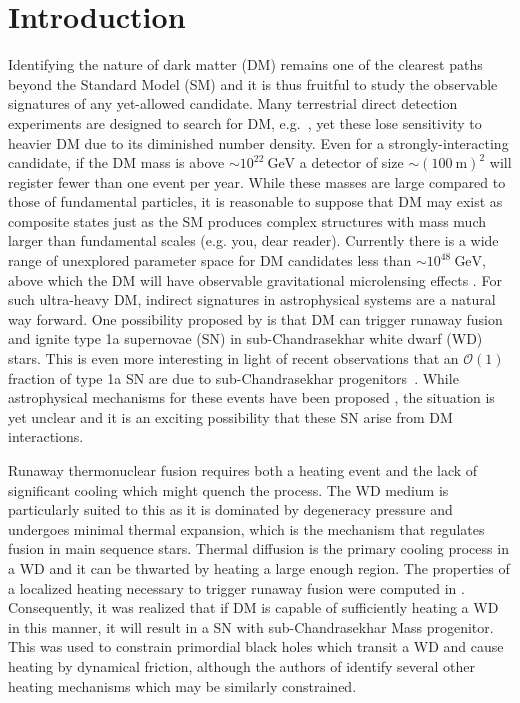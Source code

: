 \documentclass[twocolumn, preprintnumbers,amsmath,amssymb,prd, superscriptaddress]{revtex4}
\newcommand{\OO}{\mathcal{O}}
\newcommand{\GeV}{\text{GeV}}
\begin{document}
\section{Introduction}
\label{sec:Introduction}

Identifying the nature of dark matter (DM) remains one of the clearest paths beyond the Standard Model (SM) and it is thus fruitful to study the observable signatures of any yet-allowed candidate.
Many terrestrial direct detection experiments are designed to search for DM, e.g.~\cite{Akerib:2016vxi, Agnese:2017njq}, yet these lose sensitivity to heavier DM due to its diminished number density.
Even for a strongly-interacting candidate, if the DM mass is above $\sim 10^{22} ~\GeV$ a detector of size $\sim (100 ~\text{m})^2$ will register fewer than one event per year.
While these masses are large compared to those of fundamental particles, it is reasonable to suppose that DM may exist as composite states just as the SM produces complex structures with mass much larger than fundamental scales (e.g. you, dear reader).
Currently there is a wide range of unexplored parameter space for DM candidates less than $\sim 10^{48} ~\GeV$, above which the DM will have observable gravitational microlensing effects \cite{Griest:2013aaa}.
For such ultra-heavy DM, indirect signatures in astrophysical systems are a natural way forward.
One possibility proposed by \cite{Graham:2015apa} is that DM can trigger runaway fusion and ignite type 1a supernovae (SN) in sub-Chandrasekhar white dwarf (WD) stars.
This is even more interesting in light of recent observations that an $\OO(1)$ fraction of type 1a SN are due to sub-Chandrasekhar progenitors~\cite{Scalzo:2014sap, Scalzo:2014wxa}.
While astrophysical mechanisms for these events have been proposed \cite{Woosley1994,Fink:2007fv}, the situation is yet unclear and it is an exciting possibility that these SN arise from DM interactions.

Runaway thermonuclear fusion requires both a heating event and the lack of significant cooling which might quench the process.
The WD medium is particularly suited to this as it is dominated by degeneracy pressure and undergoes minimal thermal expansion, which is the mechanism that regulates fusion in main sequence stars.
Thermal diffusion is the primary cooling process in a WD and it can be thwarted by heating a large enough region.
The properties of a localized heating necessary to trigger runaway fusion were computed in \cite{Woosley}.
Consequently, it was realized \cite{Graham:2015apa} that if DM is capable of sufficiently heating a WD in this manner, it will result in a SN with sub-Chandrasekhar Mass progenitor.
This was used to constrain primordial black holes which transit a WD and cause heating by dynamical friction, although the authors of \cite{Graham:2015apa} identify several other heating mechanisms which may be similarly constrained.
\end{document}
